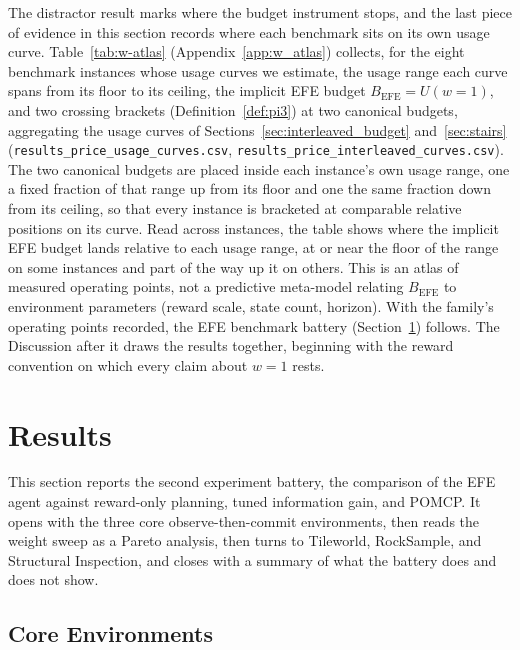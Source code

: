 The distractor result marks where the budget instrument stops, and the last piece of evidence in this section records where each benchmark sits on its own usage curve. Table~\ref{tab:w-atlas} (Appendix~\ref{app:w_atlas}) collects, for the eight benchmark instances whose usage curves we estimate, the usage range each curve spans from its floor to its ceiling, the implicit EFE budget $B_{\mathrm{EFE}} = U(w{=}1)$, and two crossing brackets (Definition~\ref{def:pi3}) at two canonical budgets, aggregating the usage curves of Sections~\ref{sec:interleaved_budget} and~\ref{sec:stairs} (\texttt{results\_\allowbreak price\_\allowbreak usage\_\allowbreak curves.csv}, \texttt{results\_\allowbreak price\_\allowbreak interleaved\_\allowbreak curves.csv}). The two canonical budgets are placed inside each instance's own usage range, one a fixed fraction of that range up from its floor and one the same fraction down from its ceiling, so that every instance is bracketed at comparable relative positions on its curve. Read across instances, the table shows where the implicit EFE budget lands relative to each usage range, at or near the floor of the range on some instances and part of the way up it on others. This is an atlas of measured operating points, not a predictive meta-model relating $B_{\mathrm{EFE}}$ to environment parameters (reward scale, state count, horizon). With the family's operating points recorded, the EFE benchmark battery (Section~\ref{sec:results}) follows. The Discussion after it draws the results together, beginning with the reward convention on which every claim about $w{=}1$ rests.

\section{Results}
\label{sec:results}

This section reports the second experiment battery, the comparison of the EFE agent against reward-only planning, tuned information gain, and POMCP. It opens with the three core observe-then-commit environments, then reads the weight sweep as a Pareto analysis, then turns to Tileworld, RockSample, and Structural Inspection, and closes with a summary of what the battery does and does not show.


\subsection{Core Environments}

